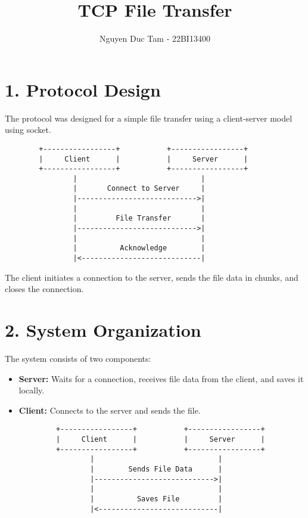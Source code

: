 \documentclass[12pt]{article}
\title{TCP File Transfer}
\author{Nguyen Duc Tam - 22BI13400}
\date{}
\begin{document}
\maketitle

\section*{1. Protocol Design}

The protocol was designed for a simple file transfer using a client-server model using socket.

\begin{verbatim}
        +-----------------+           +-----------------+
        |     Client      |           |     Server      |
        +-----------------+           +-----------------+
                |                             |
                |       Connect to Server     |
                |---------------------------->|
                |                             |
                |         File Transfer       |
                |---------------------------->|
                |                             |
                |          Acknowledge        |
                |<----------------------------|
\end{verbatim}

The client initiates a connection to the server, sends the file data in chunks, and closes the connection.

\section*{2. System Organization}

The system consists of two components:
\begin{itemize}
    \item \textbf{Server:} Waits for a connection, receives file data from the client, and saves it locally.
    \item \textbf{Client:} Connects to the server and sends the file.
\end{itemize}

\begin{verbatim}
            +-----------------+           +-----------------+
            |     Client      |           |     Server      |
            +-----------------+           +-----------------+
                    |                             |
                    |        Sends File Data      |
                    |---------------------------->|
                    |                             |
                    |          Saves File         |
                    |<----------------------------|
\end{verbatim}
\end{document}

